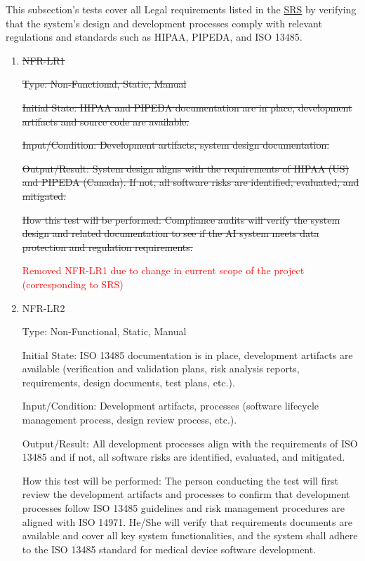 \documentclass[12pt, titlepage]{article}
\begin{document}
\begin{enumerate}
\begin{enumerate}
\begin{enumerate}
\begin{enumerate}
This subsection's tests cover all Legal requirements listed in the \href{https://github.com/RezaJodeiri/CXR-Capstone/blob/main/docs/SRS/SRS.pdf}{SRS} \citep{SRS}
 by verifying that the system's design and development processes comply with relevant regulations and standards such as HIPAA, PIPEDA, and ISO 13485.

\begin{enumerate}

\item{\sout{NFR-LR1}\\}\label{NFR-LR1}

\sout{Type: Non-Functional, Static, Manual}

\sout{Initial State: HIPAA and PIPEDA documentation are in place, development artifacts and source code are available.}

\sout{Input/Condition: Development artifacts, system design documentation.}

\sout{Output/Result: System design aligns with the requirements of HIPAA (US) and PIPEDA (Canada). If not, all software risks are identified, evaluated, and mitigated.}

\sout{How this test will be performed: Compliance audits will verify the system design and related documentation to see if the AI system meets data protection and regulation requirements.}


\textcolor{red}{Removed NFR-LR1 due to change in current scope of the project (corresponding to SRS)}

\item{NFR-LR2\\}\label{NFR-LR2}

Type: Non-Functional, Static, Manual

Initial State: ISO 13485 documentation is in place, development artifacts are available (verification and validation plans, risk analysis reports, requirements, design documents, test plans, etc.).

Input/Condition: Development artifacts, processes (software lifecycle management process, design review process, etc.).

Output/Result: All development processes align with the requirements of ISO 13485 and if not, all software risks are identified, evaluated, and mitigated.

How this test will be performed: The person conducting the test will first review the development artifacts and processes to confirm that development processes follow ISO 13485 guidelines and risk management procedures are aligned with ISO 14971. He/She will verify that requirements documents are available and cover all key system functionalities, and the system shall adhere to the ISO 13485 standard for medical device software development.


\end{enumerate}
\end{enumerate}
\end{enumerate}
\end{enumerate}
\end{enumerate}
\end{document}
